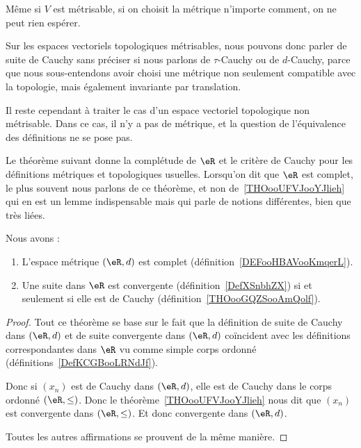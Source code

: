 \begin{remark}  \label{REMooUFQYooUVCCjs}
    Même si \( V\) est métrisable, si on choisit la métrique n'importe comment, on ne peut rien espérer.
\end{remark}

\begin{normaltext}
    Sur les espaces vectoriels topologiques métrisables, nous pouvons donc parler de suite de Cauchy sans préciser si nous parlons de \( \tau\)-Cauchy ou de \( d\)-Cauchy, parce que nous sous-entendons avoir choisi une métrique non seulement compatible avec la topologie, mais également invariante par translation.

    Il reste cependant à traiter le cas d'un espace vectoriel topologique non métrisable. Dans ce cas, il n'y a pas de métrique, et la question de l'équivalence des définitions ne se pose pas.
\end{normaltext}

Le théorème suivant donne la complétude de \( \eR\) et le critère de Cauchy pour les définitions métriques et topologiques usuelles. Lorsqu'on dit que \( \eR\) est complet, le plus souvent nous parlons de ce théorème, et non de~\ref{THOooUFVJooYJlieh} qui en est un lemme indispensable mais qui parle de notions différentes, bien que très liées.
\begin{theorem}       \label{THOooNULFooYUqQYo}
    Nous avons :
    \begin{enumerate}
        \item
            L'espace métrique \( (\eR,d)\) est complet (définition~\ref{DEFooHBAVooKmqerL}).
        \item       \label{ITEMooUUFCooIVtGgz}
            Une suite dans \( \eR\) est convergente (définition~\ref{DefXSnbhZX}) si et seulement si elle est de Cauchy (définition~\ref{THOooGQZSooAmQolf}).
    \end{enumerate}
\end{theorem}

\begin{proof}
    Tout ce théorème se base sur le fait que la définition de suite de Cauchy dans \( (\eR,d)\) et de suite convergente dans \( (\eR,d)\) coïncident avec les définitions correspondantes dans \( \eR\) vu comme simple corps ordonné (définitions~\ref{DefKCGBooLRNdJf}).

    Donc si \( (x_n)\) est de Cauchy dans \( (\eR,d)\), elle est de Cauchy dans le corps ordonné \( (\eR,\leq)\). Donc le théorème~\ref{THOooUFVJooYJlieh} nous dit que \( (x_n)\) est convergente dans \( (\eR,\leq)\). Et donc convergente dans \( (\eR,d)\).

    Toutes les autres affirmations se prouvent de la même manière.
\end{proof}

